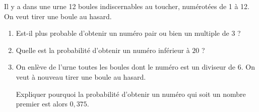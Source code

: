 
\medskip

Il y a dans une urne 12 boules indiscernables au toucher, numérotées de 1 à 12. On veut
tirer une boule au hasard.

\medskip

\begin{enumerate}
\item Est-il plus probable d'obtenir un numéro pair ou bien un multiple de $3$ ?
\item Quelle est la probabilité d'obtenir un numéro inférieur à $20$ ?
\item On enlève de l'urne toutes les boules dont le numéro est un diviseur de $6$. On veut à
nouveau tirer une boule au hasard.

Expliquer pourquoi la probabilité d'obtenir un numéro qui soit un nombre premier
est alors $0,375$.
\end{enumerate}

\vspace{0,5cm}

